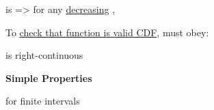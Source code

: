 \hSep

 
\begin{enumerate}
    \vItem {} is  => for any \ul{decreasing} ,

    \vItem To \ul{check that function is valid CDF}, must obey:
    \begin{enumerate}
        \vItem {}
        \vItem {}
        \vItem {} is right-continuous
    \end{enumerate}

    \vItem \textbf{Simple Properties}
    \begin{enumerate}
        \vItem {}
        \vItem {} for 
        finite intervals \iMbox{(a, b] \subseteq \mathbb{R}}

    \end{enumerate}
\end{enumerate}

\hSep
